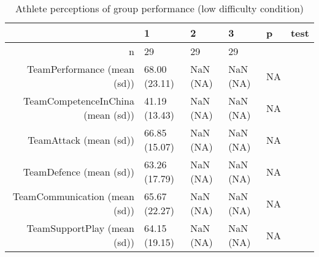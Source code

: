 \begin{table}[ht]
\centering
\begin{tabular}{rlllll}
  \hline
 & 1 & 2 & 3 & p & test \\ 
  \hline
n &    29 &  29 &  29 &  &  \\ 
  TeamPerformance (mean (sd)) & 68.00 (23.11) & NaN (NA) & NaN (NA) &  NA &  \\ 
  TeamCompetenceInChina (mean (sd)) & 41.19 (13.43) & NaN (NA) & NaN (NA) &  NA &  \\ 
  TeamAttack (mean (sd)) & 66.85 (15.07) & NaN (NA) & NaN (NA) &  NA &  \\ 
  TeamDefence (mean (sd)) & 63.26 (17.79) & NaN (NA) & NaN (NA) &  NA &  \\ 
  TeamCommunication (mean (sd)) & 65.67 (22.27) & NaN (NA) & NaN (NA) &  NA &  \\ 
  TeamSupportPlay (mean (sd)) & 64.15 (19.15) & NaN (NA) & NaN (NA) &  NA &  \\ 
   \hline
\end{tabular}
\caption{Athlete perceptions of 
 group performance (low difficulty condition)} 
\label{tab:teamPerfTimeLowTraining}
\end{table}
